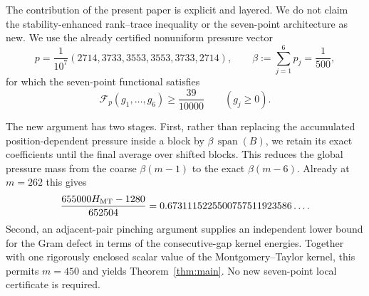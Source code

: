 The contribution of the present paper is explicit and layered.  We do not
claim the stability-enhanced rank--trace inequality or the seven-point
architecture as new.  We use the already certified nonuniform pressure vector
\begin{equation}\label{eq:p}
 p=\frac1{10^7}(2714,3733,3553,3553,3733,2714),
 \qquad
 \beta:=\sum_{j=1}^6p_j=\frac1{500},
\end{equation}
for which the seven-point functional satisfies
\begin{equation}\label{eq:local-cert-intro}
 \mathcal F_p(g_1,\ldots,g_6)\ge\frac{39}{10000}
 \qquad(g_j\ge0).
\end{equation}

The new argument has two stages.  First, rather than replacing the accumulated
position-dependent pressure inside a block by
\(\beta\,\operatorname{span}(B)\), we retain its exact coefficients until the
final average over shifted blocks.  This reduces the global pressure mass from
the coarse \(\beta(m-1)\) to the exact \(\beta(m-6)\).  Already at \(m=262\)
this gives
\[
 \frac{655000H_{\rm MT}-1280}{652504}
 =
 0.6731115225500757511923586\ldots .
\]
Second, an adjacent-pair pinching argument supplies an independent lower bound
for the Gram defect in terms of the consecutive-gap kernel energies.  Together
with one rigorously enclosed scalar value of the Montgomery--Taylor kernel,
this permits \(m=450\) and yields Theorem~\ref{thm:main}.  No new
seven-point local certificate is required.
